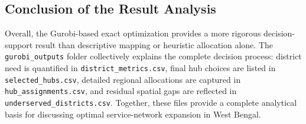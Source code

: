 \subsection{Conclusion of the Result Analysis}

Overall, the Gurobi-based exact optimization provides a more rigorous decision-support result than descriptive mapping or heuristic allocation alone. The \texttt{gurobi\_outputs} folder collectively explains the complete decision process: district need is quantified in \texttt{district\_metrics.csv}, final hub choices are listed in \texttt{selected\_hubs.csv}, detailed regional allocations are captured in \texttt{hub\_assignments.csv}, and residual spatial gaps are reflected in \texttt{underserved\_districts.csv}. Together, these files provide a complete analytical basis for discussing optimal service-network expansion in West Bengal.

